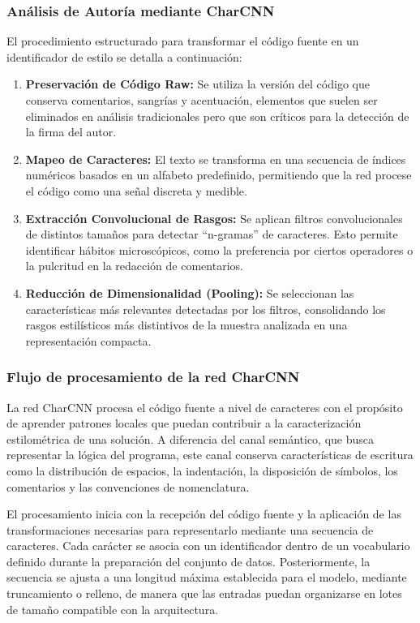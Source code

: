 \subsubsection{Análisis de Autoría mediante CharCNN}

El procedimiento estructurado para transformar el código fuente en un identificador de estilo se detalla a continuación:

\begin{enumerate}
	\item \textbf{Preservación de Código Raw:} Se utiliza la versión del código que conserva comentarios, sangrías y acentuación, elementos que suelen ser eliminados en análisis tradicionales pero que son críticos para la detección de la firma del autor.
	\item \textbf{Mapeo de Caracteres:} El texto se transforma en una secuencia de índices numéricos basados en un alfabeto predefinido, permitiendo que la red procese el código como una señal discreta y medible.
	\item \textbf{Extracción Convolucional de Rasgos:} Se aplican filtros convolucionales de distintos tamaños para detectar ``n-gramas'' de caracteres. Esto permite identificar hábitos microscópicos, como la preferencia por ciertos operadores o la pulcritud en la redacción de comentarios.
	\item \textbf{Reducción de Dimensionalidad (Pooling):} Se seleccionan las características más relevantes detectadas por los filtros, consolidando los rasgos estilísticos más distintivos de la muestra analizada en una representación compacta.
\end{enumerate}

\subsubsection{Flujo de procesamiento de la red CharCNN}

La red CharCNN procesa el código fuente a nivel de caracteres con el propósito de aprender patrones locales que puedan contribuir a la caracterización estilométrica de una solución. A diferencia del canal semántico, que busca representar la lógica del programa, este canal conserva características de escritura como la distribución de espacios, la indentación, la disposición de símbolos, los comentarios y las convenciones de nomenclatura.

El procesamiento inicia con la recepción del código fuente y la aplicación de las transformaciones necesarias para representarlo mediante una secuencia de caracteres. Cada carácter se asocia con un identificador dentro de un vocabulario definido durante la preparación del conjunto de datos. Posteriormente, la secuencia se ajusta a una longitud máxima establecida para el modelo, mediante truncamiento o relleno, de manera que las entradas puedan organizarse en lotes de tamaño compatible con la arquitectura.

